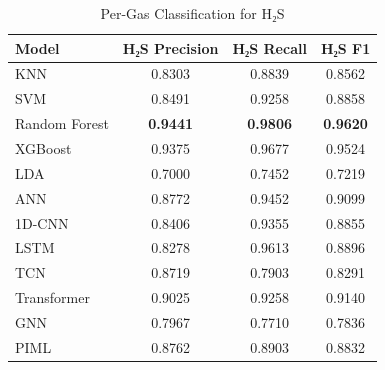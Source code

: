 \begin{table}[htbp]
\centering
\caption{Per-Gas Classification for H₂S}
\label{tab:H₂S_detail}
\begin{tabular}{lccc}
\toprule
Model & H₂S Precision & H₂S Recall & H₂S F1 \\
\midrule
KNN & 0.8303 & 0.8839 & 0.8562 \\
SVM & 0.8491 & 0.9258 & 0.8858 \\
Random Forest & \textbf{0.9441} & \textbf{0.9806} & \textbf{0.9620} \\
XGBoost & 0.9375 & 0.9677 & 0.9524 \\
LDA & 0.7000 & 0.7452 & 0.7219 \\
ANN & 0.8772 & 0.9452 & 0.9099 \\
1D-CNN & 0.8406 & 0.9355 & 0.8855 \\
LSTM & 0.8278 & 0.9613 & 0.8896 \\
TCN & 0.8719 & 0.7903 & 0.8291 \\
Transformer & 0.9025 & 0.9258 & 0.9140 \\
GNN & 0.7967 & 0.7710 & 0.7836 \\
PIML & 0.8762 & 0.8903 & 0.8832 \\
\bottomrule
\end{tabular}
\end{table}